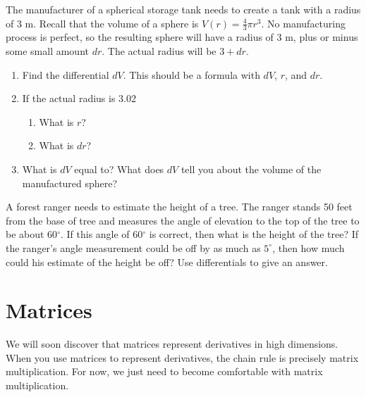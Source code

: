 \begin{problem} 
	\label{diff-sphere}
The manufacturer of a spherical storage tank needs to create a tank with a radius of 3 m. Recall that the volume of a sphere is $V(r) = \frac{4}{3}\pi r^3$. No manufacturing process is perfect, so the resulting sphere will have a radius of 3 m, plus or minus some small amount $dr$. The actual radius will be $3+dr$. 
\begin{enumerate}
\item Find the differential $dV$. This should be a formula with $dV$, $r$, and $dr$.
\item If the actual radius is 3.02
\begin{enumerate}[a]
\item What is $r$?
\item What is $dr$?
\end{enumerate}
\item What is $dV$ equal to? What does $dV$ tell you about the volume of the manufactured sphere?
\end{enumerate}
\end{problem}
 
\begin{problem}
A forest ranger needs to estimate the height of a tree.  The ranger stands 50 feet from the base of tree and measures the angle of elevation to the top of the tree to be about 60$^\circ$. If this angle of 60$^\circ$ is correct, then what is the height of the tree? If the ranger's angle measurement could be off by as much as $5^\circ$, then how much could his estimate of the height be off? Use differentials to give an answer.
\end{problem}



\unless\ifvalpo
\section{Matrices}\label{review matrices}
We will soon discover that matrices represent derivatives in high dimensions. When you use matrices to represent derivatives, the chain rule is precisely matrix multiplication. For now, we just need to become comfortable with matrix multiplication.

